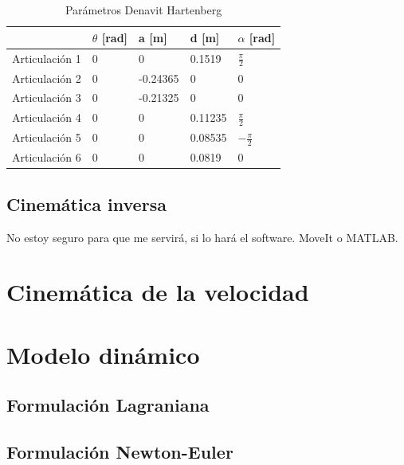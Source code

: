 \begin{table}[h]
\centering
\caption{Parámetros Denavit Hartenberg}
 \label{table:denavithartenberg}
\begin{tabular}{l|l|l|l|l|}
               & $\theta$ [rad] & a [m]    & d [m]   & $\alpha$ [rad]                        \\ 
\hline
Articulación 1 & 0                           & 0        & 0.1519  & $\frac{\pi}{2}$   \\
Articulación 2 & 0                           & -0.24365 & 0       & 0                                                  \\
Articulación 3 & 0                           & -0.21325 & 0       & 0                                                  \\
Articulación 4 & 0                           & 0        & 0.11235 & $\frac{\pi}{2}$   \\
Articulación 5 & 0                           & 0        & 0.08535 & $-\frac{\pi}{2}$  \\
Articulación 6 & 0                           & 0        & 0.0819  & 0                                                 
\end{tabular}
\end{table}

\subsection{Cinemática inversa}
No estoy seguro para que me servirá, si lo hará el software. MoveIt o MATLAB.

\section{Cinemática de la velocidad}


\section{Modelo dinámico}
\subsection{Formulación Lagraniana}
\subsection{Formulación Newton-Euler}